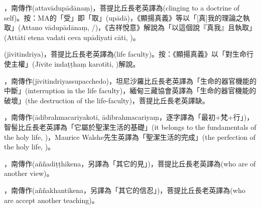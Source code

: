 \startitemgroup[noteitems]
\item{}，南傳作(attavādupādānaṃ)，菩提比丘長老英譯為(clinging to a doctrine of self)。按：MA的「受」即「取」(upādā)，《顯揚真義》等以「[真]我的理論之執取」(Attano vādupādānaṃ, /)，《吉祥悅意》解說為「以這個說『真我』且執取」(Attāti etena vadati ceva upādiyati cāti, )。
\stopitemgroup

\startitemgroup[noteitems]
\item{}(jīvitindriya)，菩提比丘長老英譯為(life faculty)。按：《顯揚真義》以「對生命行使主權」(Jīvite indaṭṭhaṃ karotīti, )解說。
\item{}，南傳作(jīvitindriyassupacchedo)，坦尼沙羅比丘長老英譯為「生命的器官機能的中斷」(interruption in the life faculty)，緬甸三藏協會英譯為「生命的器官機能的破壞」(the destruction of the life-faculty)，菩提比丘長老英譯缺。
\stopitemgroup

\startitemgroup[noteitems]
\item{}，南傳作(ādibrahmacariyakoti, ādibrahmacariyaṃ，逐字譯為「最初+梵+行」)，智髻比丘長老英譯為「它屬於聖潔生活的基礎」(it belongs to the fundamentals of the holy life, )，Maurice Walshe先生英譯為「聖潔生活的完成」(the perfection of the holy life, )。
\stopitemgroup

\startitemgroup[noteitems]
\item{}，南傳作(aññadiṭṭhikena，另譯為「其它的見」)，菩提比丘長老英譯為(who are of another view)。
\stopitemgroup

\startitemgroup[noteitems]
\item{}，南傳作(aññakhantikena，另譯為「其它的信忍」)，菩提比丘長老英譯為(who are accept another teaching)。
\stopitemgroup

